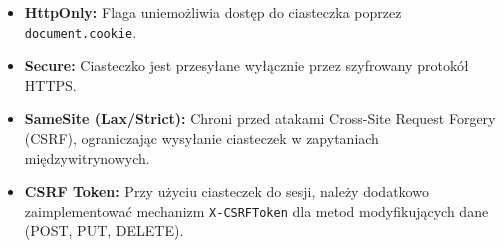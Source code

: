 \begin{itemize}
    \item \textbf{HttpOnly:} Flaga uniemożliwia dostęp do ciasteczka poprzez \texttt{document.cookie}.
    \item \textbf{Secure:} Ciasteczko jest przesyłane wyłącznie przez szyfrowany protokół HTTPS.
    \item \textbf{SameSite (Lax/Strict):} Chroni przed atakami Cross-Site Request Forgery (CSRF), ograniczając wysyłanie ciasteczek w zapytaniach międzywitrynowych.
    \item \textbf{CSRF Token:} Przy użyciu ciasteczek do sesji, należy dodatkowo zaimplementować mechanizm \texttt{X-CSRFToken} dla metod modyfikujących dane (POST, PUT, DELETE).
\end{itemize}